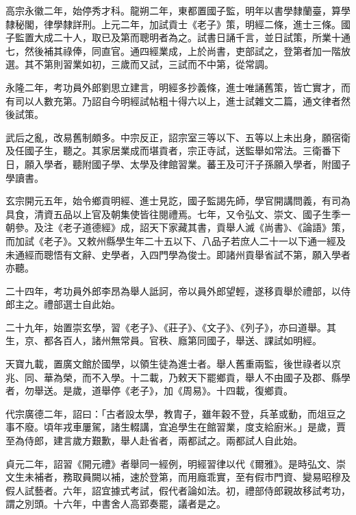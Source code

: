 \begin{pinyinscope}
 高宗永徽二年，始停秀才科。龍朔二年，東都置國子監，明年以書學隸蘭臺，算學隸秘閣，律學隸詳刑。上元二年，加試貢士《老子》策，明經二條，進士三條。國子監置大成二十人，取已及第而聰明者為之。試書日誦千言，並日試策，所業十通七，然後補其祿俸，同直官。通四經業成，上於尚書，吏部試之，登第者加一階放選。其不第則習業如初，三歲而又試，三試而不中第，從常調。



 永隆二年，考功員外郎劉思立建言，明經多抄義條，進士唯誦舊策，皆亡實才，而有司以人數充第。乃詔自今明經試帖粗十得六以上，進士試雜文二篇，通文律者然後試策。



 武后之亂，改易舊制頗多。中宗反正，詔宗室三等以下、五等以上未出身，願宿衛及任國子生，聽之。其家居業成而堪貢者，宗正寺試，送監舉如常法。三衛番下日，願入學者，聽附國子學、太學及律館習業。蕃王及可汗子孫願入學者，附國子學讀書。



 玄宗開元五年，始令鄉貢明經、進士見訖，國子監謁先師，學官開講問義，有司為具食，清資五品以上官及朝集使皆往閱禮焉。七年，又令弘文、崇文、國子生季一朝參。及注《老子道德經》成，詔天下家藏其書，貢舉人滅《尚書》、《論語》策，而加試《老子》。又敕州縣學生年二十五以下、八品子若庶人二十一以下通一經及未通經而聰悟有文辭、史學者，入四門學為俊士。即諸州貢舉省試不第，願入學者亦聽。



 二十四年，考功員外郎李昂為舉人詆訶，帝以員外郎望輕，遂移貢舉於禮部，以侍郎主之。禮部選士自此始。



 二十九年，始置崇玄學，習《老子》、《莊子》、《文子》、《列子》，亦曰道舉。其生，京、都各百人，諸州無常員。官秩、廕第同國子，舉送、課試如明經。



 天寶九載，置廣文館於國學，以領生徒為進士者。舉人舊重兩監，後世祿者以京兆、同、華為榮，而不入學。十二載，乃敕天下罷鄉貢，舉人不由國子及郡、縣學者，勿舉送。是歲，道舉停《老子》，加《周易》。十四載，復鄉貢。



 代宗廣德二年，詔曰：「古者設太學，教胄子，雖年穀不登，兵革或動，而俎豆之事不廢。頃年戎車屢駕，諸生輟講，宜追學生在館習業，度支給廚米。」是歲，賈至為侍郎，建言歲方艱歉，舉人赴省者，兩都試之。兩都試人自此始。



 貞元二年，詔習《開元禮》者舉同一經例，明經習律以代《爾雅》。是時弘文、崇文生未補者，務取員闕以補，速於登第，而用廕乖實，至有假市門資、變易昭穆及假人試藝者。六年，詔宜據式考試，假代者論如法。初，禮部侍郎親故移試考功，謂之別頭。十六年，中書舍人高郢奏罷，議者是之。




\end{pinyinscope}
